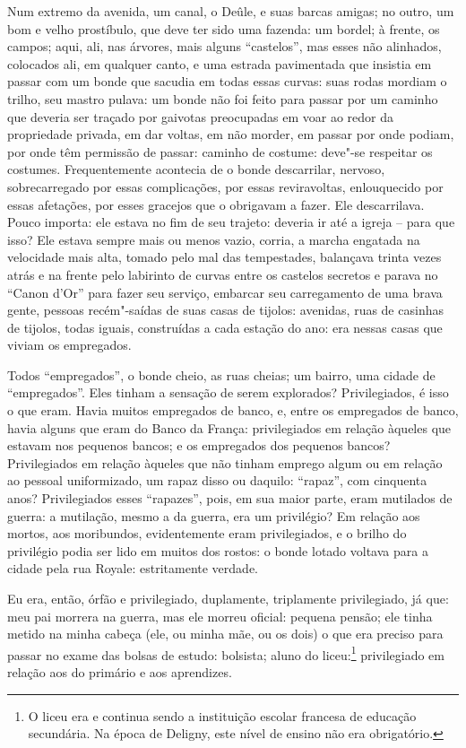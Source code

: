 Num extremo da avenida, um canal, o Deûle, e suas barcas amigas; no
outro, um bom e velho prostíbulo, que deve ter sido uma fazenda: um
bordel; à frente, os campos; aqui, ali, nas árvores, mais alguns ``castelos'',
mas esses não alinhados, colocados ali, em qualquer canto, e uma
estrada pavimentada que insistia em passar com um bonde que sacudia em
todas essas curvas: suas rodas mordiam o trilho, seu mastro pulava: um
bonde não foi feito para passar por um caminho que deveria ser traçado
por gaivotas preocupadas em voar ao redor da propriedade privada, em dar
voltas, em não morder, em passar por onde podiam, por onde têm permissão
de passar: caminho de costume: deve"-se respeitar os costumes.
Frequentemente acontecia de o bonde descarrilar, nervoso, sobrecarregado
por essas complicações, por essas reviravoltas, enlouquecido por essas
afetações, por esses gracejos que o obrigavam a fazer. Ele descarrilava.
Pouco importa: ele estava no fim de seu trajeto: deveria ir até a igreja
-- para que isso? Ele estava sempre mais ou menos vazio, corria, a
marcha engatada na velocidade mais alta, tomado pelo mal das
tempestades, balançava trinta vezes atrás e na frente pelo labirinto de
curvas entre os castelos secretos e parava no ``Canon d'Or'' para fazer
seu serviço, embarcar seu carregamento de uma brava gente, pessoas
recém"-saídas de suas casas de tijolos: avenidas, ruas de casinhas de
tijolos, todas iguais, construídas a cada estação do ano: era nessas
casas que viviam os empregados.

Todos ``empregados'', o bonde cheio, as ruas cheias; um bairro, uma
cidade de ``empregados''. Eles tinham a sensação de serem explorados?
Privilegiados, é isso o que eram. Havia muitos empregados de banco, e,
entre os empregados de banco, havia alguns que eram do Banco da França:
privilegiados em relação àqueles que estavam nos pequenos bancos; e os
empregados dos pequenos bancos? Privilegiados em relação àqueles que não
tinham emprego algum ou em relação ao pessoal uniformizado, um
rapaz disso
ou daquilo: ``rapaz'', com cinquenta anos? Privilegiados esses
``rapazes'', pois, em sua maior parte, eram mutilados de guerra: a
mutilação, mesmo a da guerra, era um privilégio? Em relação aos mortos,
aos moribundos, evidentemente eram privilegiados, e o brilho do
privilégio podia ser lido em muitos dos rostos: o bonde lotado voltava
para a cidade pela rua Royale: estritamente verdade.

Eu era, então, órfão e privilegiado, duplamente, triplamente
privilegiado, já que: meu pai morrera na guerra, mas ele morreu oficial:
pequena pensão; ele tinha metido na minha cabeça (ele, ou minha mãe, ou
os dois) o que era preciso para passar no exame das bolsas de estudo:
bolsista; aluno do liceu:\footnote{O liceu era e continua sendo a
  instituição escolar francesa de educação secundária. Na época de
  Deligny, este nível de ensino não era obrigatório.} privilegiado em
relação aos do primário e aos aprendizes.

